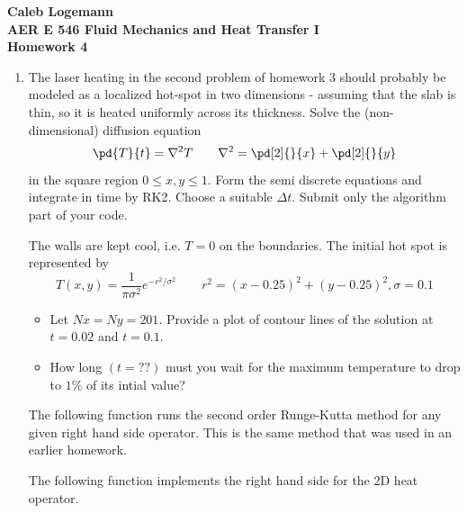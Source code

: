 \documentclass[11pt, oneside]{article}
\begin{document}
\noindent \textbf{\Large{Caleb Logemann \\
AER E 546 Fluid Mechanics and Heat Transfer I \\
Homework 4
}}

%
\begin{enumerate}
  \item %
    The laser heating in the second problem of homework 3 should probably be
    modeled as a localized hot-spot in two dimensions - assuming that the slab
    is thin, so it is heated uniformly across its thickness.
    Solve the (non-dimensional) diffusion equation
    \[
      \pd{T}{t} = \nabla^2 T \qquad \nabla^2 = \pd[2]{}{x} + \pd[2]{}{y}
    \]
    in the square region $0 \le x, y \le 1$.
    Form the semi discrete equations and integrate in time by RK2.
    Choose a suitable $\Delta t$.
    Submit only the algorithm part of your code.

    The walls are kept cool, i.e. $T = 0$ on the boundaries.
    The initial hot spot is represented by
    \[
      T(x, y) = \frac{1}{\pi \sigma^2} e^{-r^2/\sigma^2} \qquad r^2 = (x - 0.25)^2 + (y - 0.25)^2, \sigma = 0.1
    \]
    \begin{itemize}
      \item Let $Nx = Ny = 201$. Provide a plot of contour lines of the
        solution at $t = 0.02$ and $t = 0.1$.

      \item How long $(t = ??)$ must you wait for the maximum temperature to
        drop to $1\%$ of its intial value?
    \end{itemize}

    The following function runs the second order Runge-Kutta method for any
    given right hand side operator.
    This is the same method that was used in an earlier homework.
    
    The following function implements the right hand side for the 2D heat operator.
    


\end{enumerate}
\end{document}

